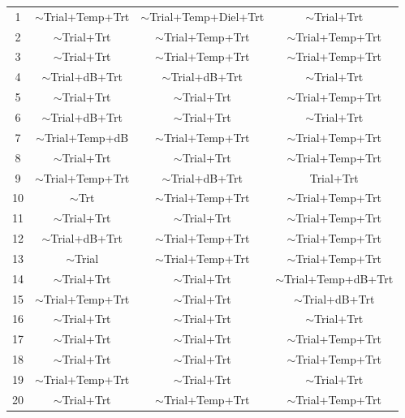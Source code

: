 \documentclass[12pt]{article}
\begin{document}
			\begin{table}[H]
			\centering
			\begin{tabular}{|c|c|c|c|}
				\hline
				\thead{Repetition} & \thead{1 min.} & \thead{5 min.} & \thead{30 min.} \\
				\hline
				1 & $\sim$Trial+Temp+Trt & $\sim$Trial+Temp+Diel+Trt & $\sim$Trial+Trt \\
				\hline
				2 & $\sim$Trial+Trt & $\sim$Trial+Temp+Trt & $\sim$Trial+Temp+Trt \\
				\hline
				3 & $\sim$Trial+Trt & $\sim$Trial+Temp+Trt & $\sim$Trial+Temp+Trt \\
				\hline
				4 & $\sim$Trial+dB+Trt & $\sim$Trial+dB+Trt & $\sim$Trial+Trt \\
				\hline
				5 & $\sim$Trial+Trt & $\sim$Trial+Trt & $\sim$Trial+Temp+Trt \\
				\hline
				6 & $\sim$Trial+dB+Trt & $\sim$Trial+Trt & $\sim$Trial+Trt \\
				\hline
				7 & $\sim$Trial+Temp+dB & $\sim$Trial+Temp+Trt & $\sim$Trial+Temp+Trt \\
				\hline
				8 & $\sim$Trial+Trt & $\sim$Trial+Trt & $\sim$Trial+Temp+Trt \\
				\hline
				9 & $\sim$Trial+Temp+Trt & $\sim$Trial+dB+Trt & Trial+Trt \\
				\hline
				10 & $\sim$Trt & $\sim$Trial+Temp+Trt & $\sim$Trial+Temp+Trt \\
				\hline
				11 & $\sim$Trial+Trt & $\sim$Trial+Trt & $\sim$Trial+Temp+Trt \\
				\hline
				12 & $\sim$Trial+dB+Trt & $\sim$Trial+Temp+Trt & $\sim$Trial+Temp+Trt \\
				\hline
				13 & $\sim$Trial & $\sim$Trial+Temp+Trt & $\sim$Trial+Temp+Trt \\
				\hline
				14 & $\sim$Trial+Trt & $\sim$Trial+Trt & $\sim$Trial+Temp+dB+Trt \\
				\hline
				15 & $\sim$Trial+Temp+Trt & $\sim$Trial+Trt & $\sim$Trial+dB+Trt \\
				\hline
				16 & $\sim$Trial+Trt & $\sim$Trial+Trt & $\sim$Trial+Trt \\
				\hline
				17 & $\sim$Trial+Trt & $\sim$Trial+Trt & $\sim$Trial+Temp+Trt \\
				\hline
				18 & $\sim$Trial+Trt & $\sim$Trial+Trt & $\sim$Trial+Temp+Trt \\
				\hline
				19 & $\sim$Trial+Temp+Trt & $\sim$Trial+Trt & $\sim$Trial+Trt \\
				\hline
				20 & $\sim$Trial+Trt & $\sim$Trial+Temp+Trt & $\sim$Trial+Temp+Trt \\

\end{tabular}
\end{table}
\end{document}

